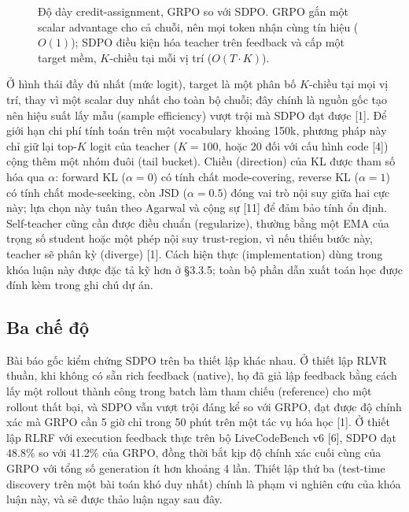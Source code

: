 \begin{figure}[H]
\centering
{}
\caption{Độ dày credit-assignment, GRPO so với SDPO. GRPO gắn một scalar advantage cho cả chuỗi, nên mọi token nhận cùng tín hiệu (\(O(1)\)); SDPO điều kiện hóa teacher trên feedback và cấp một target mềm, \(K\)-chiều tại mỗi vị trí (\(O(T\cdot K)\)).}
\label{fig:credit-density}
\end{figure}

Ở hình thái đầy đủ nhất (mức logit), target là một phân bố \(K\)-chiều tại mọi vị trí, thay vì một scalar duy nhất cho toàn bộ chuỗi; đây chính là nguồn gốc tạo nên hiệu suất lấy mẫu (sample efficiency) vượt trội mà SDPO đạt được {[}1{]}. Để giới hạn chi phí tính toán trên một vocabulary khoảng 150k, phương pháp này chỉ giữ lại top-\(K\) logit của teacher (\(K{=}100\), hoặc 20 đối với cấu hình code {[}4{]}) cộng thêm một nhóm đuôi (tail bucket). Chiều (direction) của KL được tham số hóa qua \(\alpha\): forward KL (\(\alpha{=}0\)) có tính chất mode-covering, reverse KL (\(\alpha{=}1\)) có tính chất mode-seeking, còn JSD (\(\alpha{=}0.5\)) đóng vai trò nội suy giữa hai cực này; lựa chọn này tuân theo Agarwal và cộng sự {[}11{]} để đảm bảo tính ổn định. Self-teacher cũng cần được điều chuẩn (regularize), thường bằng một EMA của trọng số student hoặc một phép nội suy trust-region, vì nếu thiếu bước này, teacher sẽ phân kỳ (diverge) {[}1{]}. Cách hiện thực (implementation) dùng trong khóa luận này được đặc tả kỹ hơn ở §3.3.5; toàn bộ phần dẫn xuất toán học được đính kèm trong ghi chú dự án.

\subsection{Ba chế độ}\label{three-regimes}

Bài báo gốc kiểm chứng SDPO trên ba thiết lập khác nhau. Ở thiết lập RLVR thuần, khi không có sẵn rich feedback (native), họ đã giả lập feedback bằng cách lấy một rollout thành công trong batch làm tham chiếu (reference) cho một rollout thất bại, và SDPO vẫn vượt trội đáng kể so với GRPO, đạt được độ chính xác mà GRPO cần 5 giờ chỉ trong 50 phút trên một tác vụ hóa học {[}1{]}. Ở thiết lập RLRF với execution feedback thực trên bộ LiveCodeBench v6 {[}6{]}, SDPO đạt 48.8\% so với 41.2\% của GRPO, đồng thời bắt kịp độ chính xác cuối cùng của GRPO với tổng số generation ít hơn khoảng 4 lần. Thiết lập thứ ba (test-time discovery trên một bài toán khó duy nhất) chính là phạm vi nghiên cứu của khóa luận này, và sẽ được thảo luận ngay sau đây.

